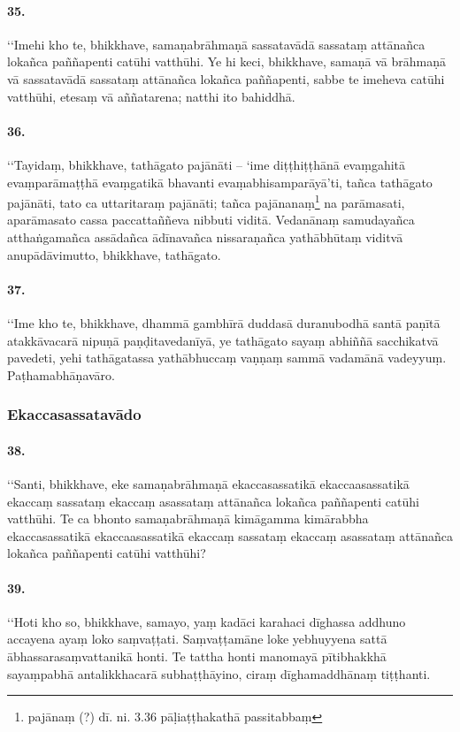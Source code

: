 \paragraph{35.}
‘‘Imehi kho te, bhikkhave, samaṇabrāhmaṇā sassatavādā sassataṃ attānañca lokañca paññapenti catūhi vatthūhi. Ye hi keci, bhikkhave, samaṇā vā brāhmaṇā vā sassatavādā sassataṃ attānañca lokañca paññapenti, sabbe te imeheva catūhi vatthūhi, etesaṃ vā aññatarena; natthi ito bahiddhā.

\paragraph{36.}
‘‘Tayidaṃ, bhikkhave, tathāgato pajānāti – ‘ime diṭṭhiṭṭhānā evaṃgahitā evaṃparāmaṭṭhā evaṃgatikā bhavanti evaṃabhisamparāyā’ti, tañca tathāgato pajānāti, tato ca uttaritaraṃ pajānāti; tañca pajānanaṃ\footnote{pajānaṃ (?) dī. ni. 3.36 pāḷiaṭṭhakathā passitabbaṃ} na parāmasati, aparāmasato cassa paccattaññeva nibbuti viditā. Vedanānaṃ samudayañca atthaṅgamañca assādañca ādīnavañca nissaraṇañca yathābhūtaṃ viditvā anupādāvimutto, bhikkhave, tathāgato.

\paragraph{37.}
‘‘Ime kho te, bhikkhave, dhammā gambhīrā duddasā duranubodhā santā paṇītā atakkāvacarā nipuṇā paṇḍitavedanīyā, ye tathāgato sayaṃ abhiññā sacchikatvā pavedeti, yehi tathāgatassa yathābhuccaṃ vaṇṇaṃ sammā vadamānā vadeyyuṃ. Paṭhamabhāṇavāro.

\subsubsection{Ekaccasassatavādo}

\paragraph{38.}
‘‘Santi, bhikkhave, eke samaṇabrāhmaṇā ekaccasassatikā ekaccaasassatikā ekaccaṃ sassataṃ ekaccaṃ asassataṃ attānañca lokañca paññapenti catūhi vatthūhi. Te ca bhonto samaṇabrāhmaṇā kimāgamma kimārabbha ekaccasassatikā ekaccaasassatikā ekaccaṃ sassataṃ ekaccaṃ asassataṃ attānañca lokañca paññapenti catūhi vatthūhi?

\paragraph{39.}
‘‘Hoti kho so, bhikkhave, samayo, yaṃ kadāci karahaci dīghassa addhuno accayena ayaṃ loko saṃvaṭṭati. Saṃvaṭṭamāne loke yebhuyyena sattā ābhassarasaṃvattanikā honti. Te tattha honti manomayā pītibhakkhā sayaṃpabhā antalikkhacarā subhaṭṭhāyino, ciraṃ dīghamaddhānaṃ tiṭṭhanti.

